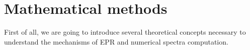 \documentclass[11.5pt,a4paper]{article}
\begin{document}
\section{Mathematical methods}
First of all, we are going to introduce several theoretical concepts necessary to understand the mechanisms of EPR and numerical spectra computation.

\end{document}
